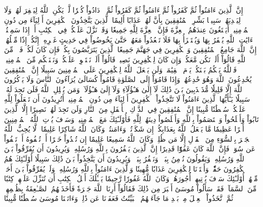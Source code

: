 إِنَّ ٱلَّذِينَ ءَامَنُواْ ثُمَّ كَفَرُواْ ثُمَّ ءَامَنُواْ ثُمَّ كَفَرُواْ ثُمَّ ٱزۡدَادُواْ كُفۡرٗا لَّمۡ يَكُنِ ٱللَّهُ لِيَغۡفِرَ لَهُمۡ وَلَا لِيَهۡدِيَهُمۡ سَبِيلَۢا
بَشِّرِ ٱلۡمُنَٰفِقِينَ بِأَنَّ لَهُمۡ عَذَابًا أَلِيمًا
ٱلَّذِينَ يَتَّخِذُونَ ٱلۡكَٰفِرِينَ أَوۡلِيَآءَ مِن دُونِ ٱلۡمُؤۡمِنِينَۚ أَيَبۡتَغُونَ عِندَهُمُ ٱلۡعِزَّةَ فَإِنَّ ٱلۡعِزَّةَ لِلَّهِ جَمِيعٗا
وَقَدۡ نَزَّلَ عَلَيۡكُمۡ فِي ٱلۡكِتَٰبِ أَنۡ إِذَا سَمِعۡتُمۡ ءَايَٰتِ ٱللَّهِ يُكۡفَرُ بِهَا وَيُسۡتَهۡزَأُ بِهَا فَلَا تَقۡعُدُواْ مَعَهُمۡ حَتَّىٰ يَخُوضُواْ فِي حَدِيثٍ غَيۡرِهِۦٓ إِنَّكُمۡ إِذٗا مِّثۡلُهُمۡۗ إِنَّ ٱللَّهَ جَامِعُ ٱلۡمُنَٰفِقِينَ وَٱلۡكَٰفِرِينَ فِي جَهَنَّمَ جَمِيعًا
ٱلَّذِينَ يَتَرَبَّصُونَ بِكُمۡ فَإِن كَانَ لَكُمۡ فَتۡحٞ مِّنَ ٱللَّهِ قَالُوٓاْ أَلَمۡ نَكُن مَّعَكُمۡ وَإِن كَانَ لِلۡكَٰفِرِينَ نَصِيبٞ قَالُوٓاْ أَلَمۡ نَسۡتَحۡوِذۡ عَلَيۡكُمۡ وَنَمۡنَعۡكُم مِّنَ ٱلۡمُؤۡمِنِينَۚ فَٱللَّهُ يَحۡكُمُ بَيۡنَكُمۡ يَوۡمَ ٱلۡقِيَٰمَةِۚ وَلَن يَجۡعَلَ ٱللَّهُ لِلۡكَٰفِرِينَ عَلَى ٱلۡمُؤۡمِنِينَ سَبِيلًا
إِنَّ ٱلۡمُنَٰفِقِينَ يُخَٰدِعُونَ ٱللَّهَ وَهُوَ خَٰدِعُهُمۡ وَإِذَا قَامُوٓاْ إِلَى ٱلصَّلَوٰةِ قَامُواْ كُسَالَىٰ يُرَآءُونَ ٱلنَّاسَ وَلَا يَذۡكُرُونَ ٱللَّهَ إِلَّا قَلِيلٗا
مُّذَبۡذَبِينَ بَيۡنَ ذَٰلِكَ لَآ إِلَىٰ هَـٰٓؤُلَآءِ وَلَآ إِلَىٰ هَـٰٓؤُلَآءِۚ وَمَن يُضۡلِلِ ٱللَّهُ فَلَن تَجِدَ لَهُۥ سَبِيلٗا
يَـٰٓأَيُّهَا ٱلَّذِينَ ءَامَنُواْ لَا تَتَّخِذُواْ ٱلۡكَٰفِرِينَ أَوۡلِيَآءَ مِن دُونِ ٱلۡمُؤۡمِنِينَۚ أَتُرِيدُونَ أَن تَجۡعَلُواْ لِلَّهِ عَلَيۡكُمۡ سُلۡطَٰنٗا مُّبِينًا
إِنَّ ٱلۡمُنَٰفِقِينَ فِي ٱلدَّرۡكِ ٱلۡأَسۡفَلِ مِنَ ٱلنَّارِ وَلَن تَجِدَ لَهُمۡ نَصِيرًا
إِلَّا ٱلَّذِينَ تَابُواْ وَأَصۡلَحُواْ وَٱعۡتَصَمُواْ بِٱللَّهِ وَأَخۡلَصُواْ دِينَهُمۡ لِلَّهِ فَأُوْلَـٰٓئِكَ مَعَ ٱلۡمُؤۡمِنِينَۖ وَسَوۡفَ يُؤۡتِ ٱللَّهُ ٱلۡمُؤۡمِنِينَ أَجۡرًا عَظِيمٗا
مَّا يَفۡعَلُ ٱللَّهُ بِعَذَابِكُمۡ إِن شَكَرۡتُمۡ وَءَامَنتُمۡۚ وَكَانَ ٱللَّهُ شَاكِرًا عَلِيمٗا
۞لَّا يُحِبُّ ٱللَّهُ ٱلۡجَهۡرَ بِٱلسُّوٓءِ مِنَ ٱلۡقَوۡلِ إِلَّا مَن ظُلِمَۚ وَكَانَ ٱللَّهُ سَمِيعًا عَلِيمًا
إِن تُبۡدُواْ خَيۡرًا أَوۡ تُخۡفُوهُ أَوۡ تَعۡفُواْ عَن سُوٓءٖ فَإِنَّ ٱللَّهَ كَانَ عَفُوّٗا قَدِيرًا
إِنَّ ٱلَّذِينَ يَكۡفُرُونَ بِٱللَّهِ وَرُسُلِهِۦ وَيُرِيدُونَ أَن يُفَرِّقُواْ بَيۡنَ ٱللَّهِ وَرُسُلِهِۦ وَيَقُولُونَ نُؤۡمِنُ بِبَعۡضٖ وَنَكۡفُرُ بِبَعۡضٖ وَيُرِيدُونَ أَن يَتَّخِذُواْ بَيۡنَ ذَٰلِكَ سَبِيلًا
أُوْلَـٰٓئِكَ هُمُ ٱلۡكَٰفِرُونَ حَقّٗاۚ وَأَعۡتَدۡنَا لِلۡكَٰفِرِينَ عَذَابٗا مُّهِينٗا
وَٱلَّذِينَ ءَامَنُواْ بِٱللَّهِ وَرُسُلِهِۦ وَلَمۡ يُفَرِّقُواْ بَيۡنَ أَحَدٖ مِّنۡهُمۡ أُوْلَـٰٓئِكَ سَوۡفَ يُؤۡتِيهِمۡ أُجُورَهُمۡۚ وَكَانَ ٱللَّهُ غَفُورٗا رَّحِيمٗا
يَسۡـَٔلُكَ أَهۡلُ ٱلۡكِتَٰبِ أَن تُنَزِّلَ عَلَيۡهِمۡ كِتَٰبٗا مِّنَ ٱلسَّمَآءِۚ فَقَدۡ سَأَلُواْ مُوسَىٰٓ أَكۡبَرَ مِن ذَٰلِكَ فَقَالُوٓاْ أَرِنَا ٱللَّهَ جَهۡرَةٗ فَأَخَذَتۡهُمُ ٱلصَّـٰعِقَةُ بِظُلۡمِهِمۡۚ ثُمَّ ٱتَّخَذُواْ ٱلۡعِجۡلَ مِنۢ بَعۡدِ مَا جَآءَتۡهُمُ ٱلۡبَيِّنَٰتُ فَعَفَوۡنَا عَن ذَٰلِكَۚ وَءَاتَيۡنَا مُوسَىٰ سُلۡطَٰنٗا مُّبِينٗا
